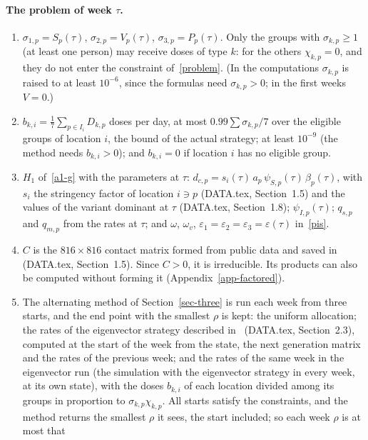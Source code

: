 \documentclass[11pt]{article}
\theoremstyle{plain}
\theoremstyle{remark}
\numberwithin{equation}{section}
\begin{document}
\paragraph{The problem of week $\tau$.}
\begin{enumerate}
\item $\sigma_{1,p}=S_p(\tau)$, $\sigma_{2,p}=V_p(\tau)$, $\sigma_{3,p}=P_p(\tau)$.
Only the groups with $\sigma_{k,p}\ge1$ (at least one person) may receive doses
of type $k$: for the others $\chi_{k,p}=0$, and they do not enter the constraint
of~\eqref{problem}. (In the computations $\sigma_{k,p}$ is raised to at least
$10^{-6}$, since the formulas need $\sigma_{k,p}>0$; in the first weeks $V=0$.)
\item $b_{k,i}=\frac17\sum_{p\in I_i}D_{k,p}$ doses per day, at most
$0.99\sum\sigma_{k,p}/7$ over the eligible groups of location $i$, the bound of
the actual strategy; at least $10^{-9}$ (the method needs $b_{k,i}>0$); and
$b_{k,i}=0$ if location $i$ has no eligible group.
\item $H_1$ of~\eqref{a1-g} with the parameters at $\tau$:
$d_{c,p}=s_i(\tau)\,a_p\,\psi_{S,p}(\tau)\,\beta_p(\tau)$, with $s_i$ the stringency
factor of location $i\ni p$ (DATA.tex, Section~1.5) and the values of the variant
dominant at $\tau$ (DATA.tex, Section~1.8); $\psi_{I,p}(\tau)$; $q_{s,p}$ and
$q_{m,p}$ from the rates at $\tau$; and $\omega$, $\omega_v$,
$\varepsilon_1=\varepsilon_2=\varepsilon_3=\varepsilon(\tau)$ in~\eqref{pis}.
\item $C$ is the $816\times816$ contact matrix formed from public data and saved in
 (DATA.tex, Section~1.5). Since
$C>0$, it is irreducible. Its products can also be computed without forming it
(Appendix~\ref{app-factored}).
\item The alternating method of Section~\ref{sec-three} is run each week from
three starts, and the end point with the smallest $\rho$ is kept: the uniform
allocation; the rates of the eigenvector strategy
described in~\cite{2026Feng_Day_Glasser} (DATA.tex, Section~2.3), computed at the start of
the week from the state, the next generation matrix and the rates of the
previous week; and the rates of the same week in the eigenvector run (the
simulation with the eigenvector strategy in every week, at its own state), with
the doses $b_{k,i}$ of each location divided among its groups in proportion to
$\sigma_{k,p}\chi_{k,p}$. All starts satisfy the constraints, and the method returns the
smallest $\rho$ it sees, the start included; so each week $\rho$ is at most that

\end{enumerate}
\end{document}
